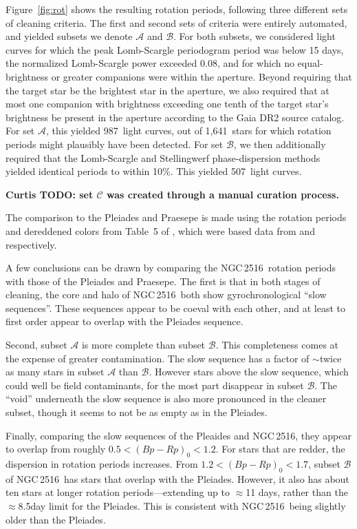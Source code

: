 \documentclass[12pt,twocolumn,tighten]{aastex63}
\newcommand{\cn}{NGC\,2516} %
\newcommand{\nautorotdenominator}{1{,}641\ } %
\newcommand{\nautorotnumerator}{987\ } %
\newcommand{\nautorotnumeratormatching}{507\ } %
\begin{document}
Figure~\ref{fig:rot} shows the resulting rotation periods, following
three different sets of cleaning criteria.  The first and second sets
of criteria were entirely automated, and yielded subsets we denote
$\mathcal{A}$ and $\mathcal{B}$.  For both subsets, we considered
light curves for which the peak Lomb-Scargle periodogram period was
below 15 days, the normalized Lomb-Scargle power exceeded 0.08, and
for which no equal-brightness or greater companions were within the
aperture.  Beyond requiring that the target star be the brightest star
in the aperture, we also required that at most one companion with
brightness exceeding one tenth of the target star's brightness be
present in the aperture according to the Gaia DR2 source catalog.  For
set $\mathcal{A}$, this yielded \nautorotnumerator light curves, out
of \nautorotdenominator stars for which rotation periods might
plausibly have been detected.  For set $\mathcal{B}$, we then
additionally required that the Lomb-Scargle and Stellingwerf
phase-dispersion methods yielded identical periods to within 10\%.
This yielded \nautorotnumeratormatching light curves. 

{\bf Curtis TODO: set $\mathcal{C}$ was created through a manual
curation process.}

The comparison to the Pleiades and Praesepe is made using the rotation
periods and dereddened colors from Table~5 of
\citet{curtis_rup147_2020}, which were based data from
\citet{rebull_rotation_2016a} and \citet{douglas_k2_2019}
respectively.

A few conclusions can be drawn by comparing the \cn\ rotation periods
with those of the Pleiades and Praesepe.  The first is that in both
stages of cleaning, the core and halo of \cn\ both show
gyrochronological ``slow sequences''.  These sequences appear to be
coeval with each other, and at least to first order appear to overlap
with the Pleiades sequence.

Second, subset $\mathcal{A}$ is more complete than subset
$\mathcal{B}$.  This completeness comes at the expense of greater
contamination.  The slow sequence has a factor of $\sim$twice as many
stars in subset $\mathcal{A}$ than $\mathcal{B}$.  However stars above
the slow sequence, which could well be field contaminants, for the
most part disappear in subset $\mathcal{B}$.  The ``void'' underneath
the slow sequence is also more pronounced in the cleaner subset,
though it seems to not be as empty as in the Pleiades.

Finally, comparing the slow sequences of the Pleaides and \cn, they
appear to overlap from roughly $0.5<(Bp-Rp)_0<1.2$.  For stars that
are redder, the dispersion in rotation periods increases.  From
$1.2<(Bp-Rp)_0<1.7$, subset $\mathcal{B}$ of \cn\ has stars that
overlap with the Pleiades.  However, it also has about ten stars at
longer rotation periods---extending up to $\approx$11 days, rather
than the $\approx$8.5day limit for the Pleiades.  This is consistent
with \cn\ being slightly older than the Pleiades.
\end{document}
